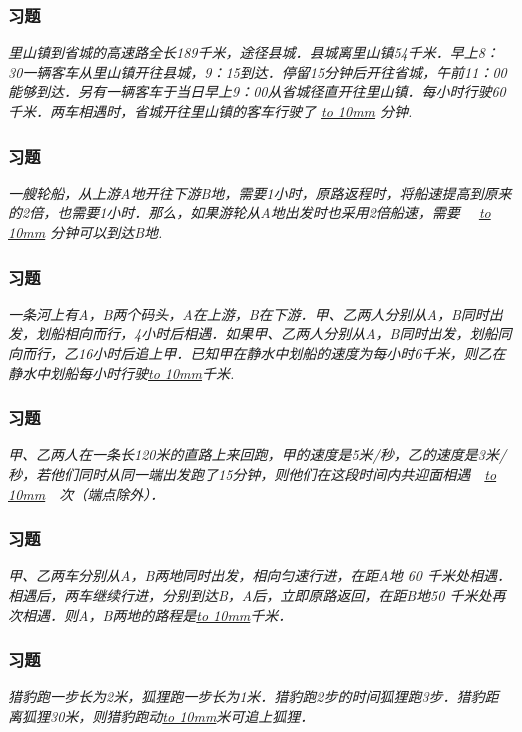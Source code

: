 \begin{frame}
    \frametitle{习题\theframecounter}
    \textit{里山镇到省城的高速路全长189千米，途径县城．县城离里山镇54千米．早上8：30一辆客车从里山镇开往县城，9：15到达．停留15分钟后开往省城，午前11：00能够到达．另有一辆客车于当日早上9：00从省城径直开往里山镇．每小时行驶60千米．两车相遇时，省城开往里山镇的客车行驶了 \underline{\hbox to 10mm{}} 分钟.}
\end{frame}

\begin{frame}
    \frametitle{习题\theframecounter}
    \textit{一艘轮船，从上游A地开往下游B地，需要1小时，原路返程时，将船速提高到原来的2倍，也需要1小时．那么，如果游轮从A地出发时也采用2倍船速，需要　 \underline{\hbox to 10mm{}} 分钟可以到达B地.}
\end{frame}

\begin{frame}
    \frametitle{习题\theframecounter}
    \textit{一条河上有A，B两个码头，A在上游，B在下游．甲、乙两人分别从A，B同时出发，划船相向而行，4小时后相遇．如果甲、乙两人分别从A，B同时出发，划船同向而行，乙16小时后追上甲．已知甲在静水中划船的速度为每小时6千米，则乙在静水中划船每小时行驶\underline{\hbox to 10mm{}}千米.}
\end{frame}

\begin{frame}
    \frametitle{习题\theframecounter}
    \textit{甲、乙两人在一条长120米的直路上来回跑，甲的速度是5米/秒，乙的速度是3米/秒，若他们同时从同一端出发跑了15分钟，则他们在这段时间内共迎面相遇　\underline{\hbox to 10mm{}}　次（端点除外）．}
\end{frame}

\begin{frame}
    \frametitle{习题\theframecounter}
    \textit{甲、乙两车分别从A，B两地同时出发，相向匀速行进，在距A地 60 千米处相遇．相遇后，两车继续行进，分别到达B，A后，立即原路返回，在距B地50 千米处再次相遇．则A，B两地的路程是\underline{\hbox to 10mm{}}千米．}
\end{frame}

\begin{frame}
    \frametitle{习题\theframecounter}
    \textit{猎豹跑一步长为2米，狐狸跑一步长为1米．猎豹跑2步的时间狐狸跑3步．猎豹距离狐狸30米，则猎豹跑动\underline{\hbox to 10mm{}}米可追上狐狸．}
\end{frame}
